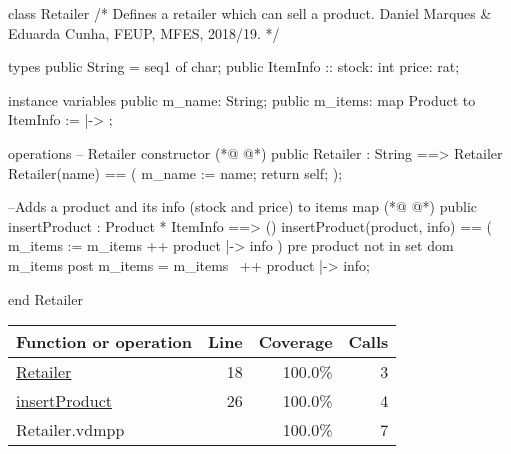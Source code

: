 \begin{vdmpp}[breaklines=true]
class Retailer
/*
  Defines a retailer which can sell a product.
  Daniel Marques & Eduarda Cunha, FEUP, MFES, 2018/19.
*/

types
 public String = seq1 of char;
 public ItemInfo :: stock: int
             price: rat;

instance variables
 public m_name: String;
 public m_items: map Product to ItemInfo := { |-> };

operations
 -- Retailer constructor
(*@
\label{Retailer:18}
@*)
 public Retailer : String ==> Retailer
 Retailer(name) ==
 (
  m_name := name;
  return self;
 );
 
 --Adds a product and its info (stock and price) to items map
(*@
\label{insertProduct:26}
@*)
 public insertProduct : Product * ItemInfo ==> ()
 insertProduct(product, info) ==
 (
  m_items := m_items ++ {product |-> info}
 )
 pre product not in set dom m_items
 post m_items = m_items~ ++ {product |-> info};

end Retailer
\end{vdmpp}
\bigskip
\begin{longtable}{|l|r|r|r|}
\hline
Function or operation & Line & Coverage & Calls \\
\hline
\hline
\hyperref[Retailer:18]{Retailer} & 18&100.0\% & 3 \\
\hline
\hyperref[insertProduct:26]{insertProduct} & 26&100.0\% & 4 \\
\hline
\hline
Retailer.vdmpp & & 100.0\% & 7 \\
\hline
\end{longtable}

